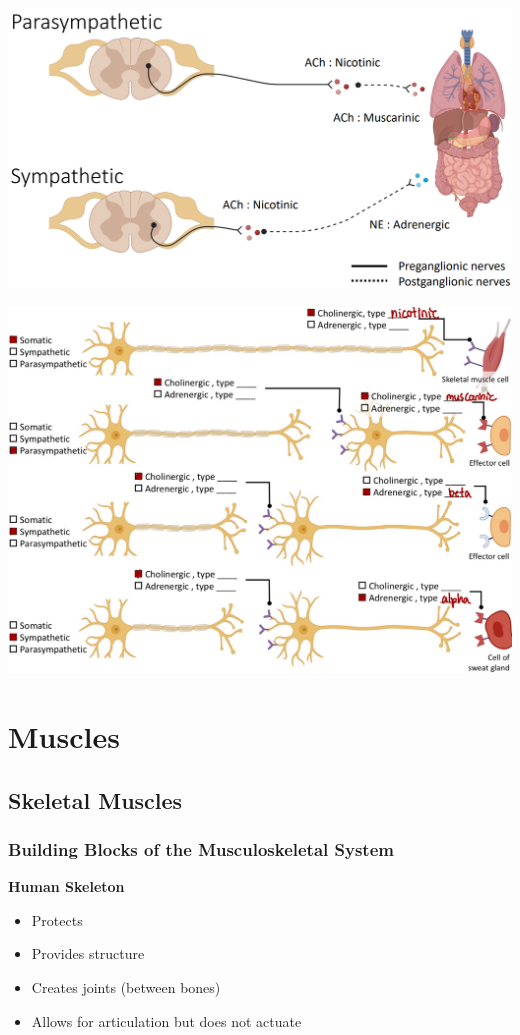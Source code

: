 \documentclass[11pt,fleqn]{book} %
\begin{document}
\begin{center}
    \includegraphics[width=0.65\linewidth]{Pictures/Screenshot 2024-03-06 205513.png}
\end{center}

\begin{exercise}
    \begin{center}
    \includegraphics[width=0.95\linewidth]{Pictures/Screenshot 2024-04-03 230126.png}
\end{center}
\end{exercise}

\chapter{Muscles}
\section{Skeletal Muscles}
\subsection{Building Blocks of the Musculoskeletal System}
\textbf{Human Skeleton}
\begin{itemize}
    \item Protects
    \item Provides structure
    \item Creates joints (between bones)
    \item Allows for articulation but does not actuate
\end{itemize}
\end{document}
